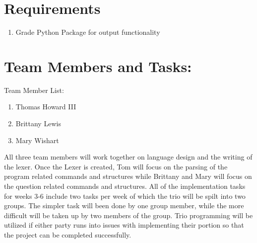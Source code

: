 \documentclass{article}
\begin{document}
    \section{Requirements}
    \begin{enumerate}
        \item Grade Python Package for output functionality
    \end{enumerate}
    
    \section {Team Members and Tasks:}
    Team Member List:
    
    \begin{enumerate}
        \item Thomas Howard III
        \item Brittany Lewis
        \item Mary Wishart
    \end{enumerate}
    
    All three team members will work together on language design and the writing of the lexer. Once the Lexer is created, Tom will focus on the parsing of the program related commands and structures while Brittany and Mary will focus on the question related commands and structures. All of the implementation tasks for weeks 3-6 include two tasks per week of which the trio will be spilt into two groups. The simpler task will been done by one group member, while the more difficult will be taken up by two members of the group. Trio programming will be utilized if either party runs into issues with implementing their portion so that the project can be completed successfully.
\end{document}
